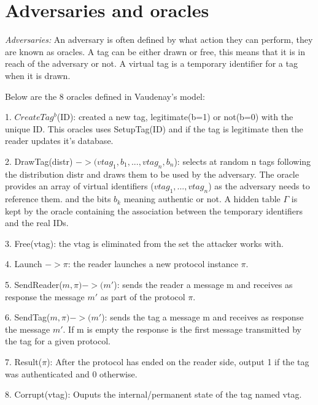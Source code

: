\vspace{0.3cm}
\hspace{1cm}
\section{Adversaries and oracles}
\hspace{0.5cm}
    \textit{Adversaries:} An adversary is often defined by what action they can perform, they are 
    known as oracles. A tag can be either drawn or free, this means that it is in reach of the 
    adversary or not. A virtual tag is a temporary identifier for a tag when it is drawn.

    \vspace{0.3cm}
    
    Below are the 8 oracles defined in Vaudenay's model:

    1. $CreateTag^b$(ID): created a new tag, legitimate(b=1) or not(b=0) with the unique ID.
        This oracles uses SetupTag(ID) and if the tag is legitimate then the reader 
        updates it's database.
    
    2. DrawTag(distr) $-> (vtag_1, b_1, ... , vtag_n, b_n$): selects at random n tags following the 
    distribution distr and draws them to be used by the adversary. The oracle provides
    an array of virtual identifiers ($vtag_1, ... ,vtag_n$) as the adversary needs to reference them.
    and the bits $b_k$ meaning authentic or not. A hidden table $\Gamma$ is kept by the oracle
    containing the association between the temporary identifiers and the real IDs.

    3. Free(vtag): the vtag is eliminated from the set the attacker works with.
    
    4. Launch $-> \pi$: the reader launches a new protocol instance $\pi$.

    5. SendReader($m, \pi) -> (m'$): sends the reader a message m and receives as response 
    the message $m'$ as part of the protocol $\pi$.

    6. SendTag($m, \pi) -> (m'$): sends the tag a message m and receives as response 
    the message $m'$. If m is empty the response is the first message transmitted by the tag for
    a given protocol. 

    7. Result($\pi$): After the protocol has ended on the reader side, output 1 if the tag was 
    authenticated and 0 otherwise.

    8. Corrupt(vtag): Ouputs the internal/permanent state of the tag named vtag.

